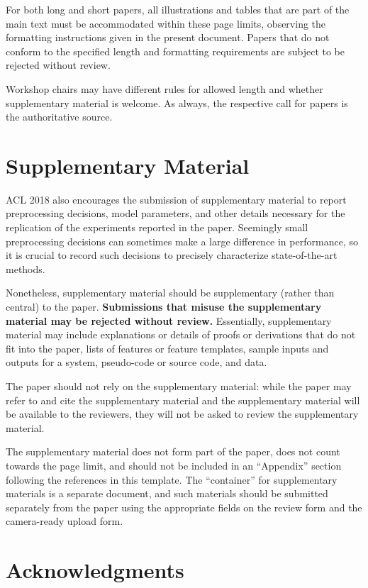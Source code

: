 \documentclass[11pt,a4paper]{article}
\begin{document}
For both long and short papers, all illustrations and tables that are part
of the main text must be accommodated within these page limits, observing
the formatting instructions given in the present document.
Papers that do not conform to the specified length and
formatting requirements are subject to be rejected without
review.

Workshop chairs may have different rules for allowed length and
whether supplementary material is welcome. As always, the respective
call for papers is the authoritative source.

\section{Supplementary Material}
\label{sec:supplemental}
ACL 2018 also encourages the submission of supplementary material
to report preprocessing decisions, model parameters, and other details
necessary for the replication of the experiments reported in the
paper. Seemingly small preprocessing decisions can sometimes make
a large difference in performance, so it is crucial to record such
decisions to precisely characterize state-of-the-art methods.

Nonetheless, supplementary material should be supplementary (rather
than central) to the paper. \textbf{Submissions that misuse the supplementary
material may be rejected without review.}
Essentially, supplementary material may include explanations or details
of proofs or derivations that do not fit into the paper, lists of
features or feature templates, sample inputs and outputs for a system,
pseudo-code or source code, and data.

The paper should not rely on the supplementary material: while the paper
may refer to and cite the supplementary material and the supplementary material will be available to the
reviewers, they will not be asked to review the
supplementary material.

The supplementary material does not form part of the paper, does not count towards the page limit, and should not be included in an ``Appendix'' section following the references in this template. The ``container'' for supplementary materials is a separate document, and such materials should be submitted separately from the paper using the appropriate fields on the review form and the camera-ready upload form.

\section*{Acknowledgments}
\end{document}
